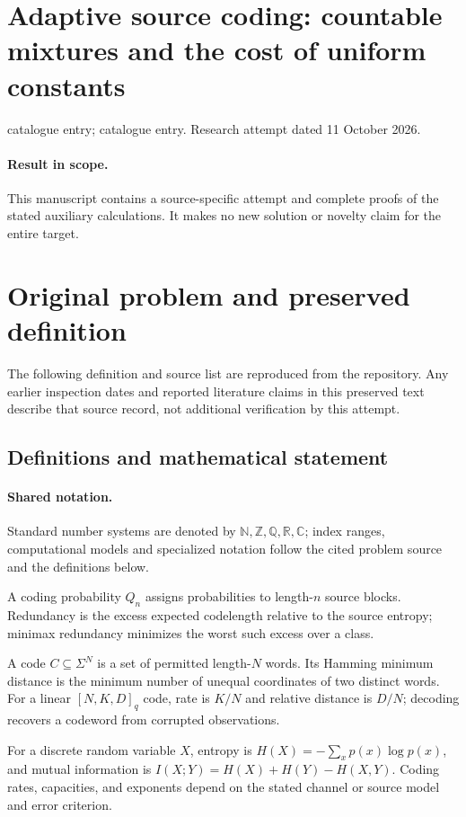 \documentclass[11pt]{article}
\begin{document}
\section*{Adaptive source coding: countable mixtures and the cost of uniform constants}
\noindent catalogue entry; catalogue entry. Research attempt dated 11 October 2026.
\paragraph{Result in scope.}This manuscript contains a source-specific attempt and complete proofs of the stated auxiliary calculations. It makes no new solution or novelty claim for the entire target.
\section{Original problem and preserved definition}
The following definition and source list are reproduced from the repository. Any earlier inspection dates and reported literature claims in this preserved text describe that source record, not additional verification by this attempt.
\subsection{Definitions and mathematical statement}

\paragraph{Shared notation.}Standard number systems are denoted by $\mathbb N,\mathbb Z,\mathbb Q,\mathbb R,\mathbb C$; index ranges, computational models and specialized notation follow the cited problem source and the definitions below.


A coding probability $Q_n$ assigns probabilities to length-$n$ source blocks. Redundancy is the excess expected codelength relative to the source entropy; minimax redundancy minimizes the worst such excess over a class.

A code $C\subseteq\Sigma^N$ is a set of permitted length-$N$ words. Its Hamming minimum distance is the minimum number of unequal coordinates of two distinct words. For a linear $[N,K,D]_q$ code, rate is $K/N$ and relative distance is $D/N$; decoding recovers a codeword from corrupted observations.

For a discrete random variable $X$, entropy is $H(X)=-\sum_xp(x)\log p(x)$, and mutual information is $I(X;Y)=H(X)+H(Y)-H(X,Y)$. Coding rates, capacities, and exponents depend on the stated channel or source model and error criterion.
\end{document}
